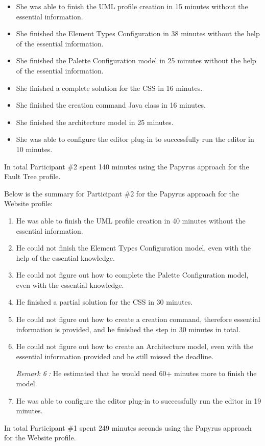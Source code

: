 \begin{itemize}
	\item She was able to finish the UML profile creation in 15 minutes without the essential information. 
	\item She finished the Element Types Configuration in 38 minutes without the help of the essential information.
	\item She finished the Palette Configuration model in 25 minutes without the help of the essential information.
	\item She finished a complete solution for the CSS in 16 minutes.
	\item She finished the creation command Java class in 16 minutes.
	\item She finished the architecture model in 25 minutes.
	\item She was able to configure the editor plug-in to successfully run the editor in 10 minutes.
\end{itemize}
In total Participant \#2 spent 140 minutes using the Papyrus approach for the Fault Tree profile.

Below is the summary for Participant \#2 for the Papyrus approach for the Website profile:
\begin{enumerate}
	\item He was able to finish the UML profile creation in 40 minutes without the essential information. 
	\item He could not finish the Element Types Configuration model, even with the help of the essential knowledge. 
	\item He could not figure out how to complete the Palette Configuration model, even with the essential knowledge. 
	\item He finished a partial solution for the CSS in 30 minutes.
	\item He could not figure out how to create a creation command, therefore essential information is provided, and he finished the step in 30 minutes in total.
	\item He could not figure out how to create an Architecture model, even with the essential information provided and he still missed the deadline. 
	
	\textit{Remark \textcircled{6}:} He estimated that he would need 60+ minutes more to finish the model.
	\item He was able to configure the editor plug-in to successfully run the editor in 19 minutes.
\end{enumerate}
In total Participant \#1 spent 249 minutes seconds using the Papyrus approach for the Website profile.

